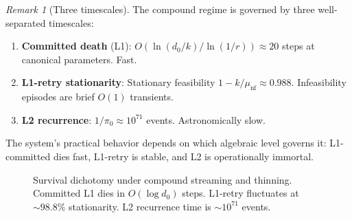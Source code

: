 \documentclass[11pt]{article}
\theoremstyle{plain}
\theoremstyle{definition}
\theoremstyle{remark}
\newtheorem{remark}[theorem]{Remark}
\begin{document}
\begin{remark}[Three timescales]\label{rem:timescales}
The compound regime is governed by three well-separated timescales:
\begin{enumerate}[label=(\roman*),nosep]
  \item \textbf{Committed death} (L1): $O(\ln(d_0/k)/\ln(1/r))
    \approx 20$ steps at canonical parameters.  Fast.
  \item \textbf{L1-retry stationarity}: Stationary feasibility
    $1 - k/\mu_{\mathrm{nf}} \approx 0.988$.  Infeasibility episodes
    are brief $O(1)$ transients.
  \item \textbf{L2 recurrence}: $1/\pi_0 \approx 10^{71}$ events.
    Astronomically slow.
\end{enumerate}
The system's practical behavior depends on which algebraic level
governs it: L1-committed dies fast, L1-retry is stable, and L2 is
operationally immortal.
\end{remark}

\begin{figure}[t]
\centering
{}
\caption{Survival dichotomy under compound streaming and thinning.
  Committed L1 dies in $O(\log d_0)$ steps.  L1-retry fluctuates at
  ${\sim}98.8\%$ stationarity.  L2 recurrence time is
  ${\sim}10^{71}$ events.}
\label{fig:survival}
\end{figure}
\end{document}
